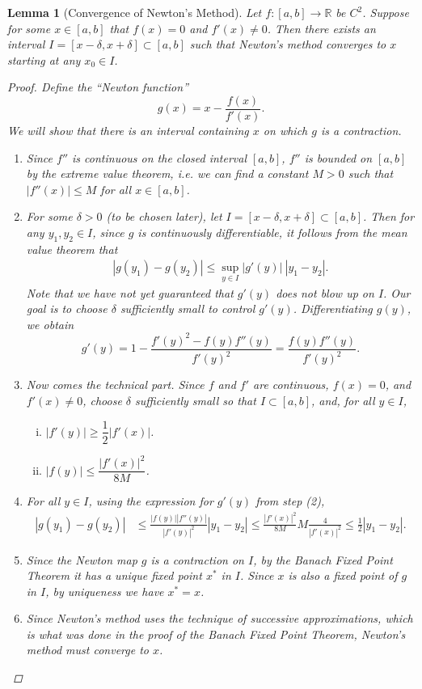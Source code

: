 \documentclass[12pt]{amsart}         %
\newtheorem{lemma}{Lemma}[section]
\theoremstyle{remark}
\newcommand{\R}{\mathbb{R}}
\begin{document}
\begin{lemma}[Convergence of Newton's Method]
Let $f: [a, b] \rightarrow \R$ be $C^2$. Suppose for some $x \in [a, b]$ that $f(x) = 0$ and $f'(x) \neq 0$. Then there exists an interval $I = [x - \delta, x + \delta] \subset [a, b]$ such that Newton's method converges to $x$ starting at any $x_0 \in I$.
\begin{proof}
Define the ``Newton function''
\[
g(x) = x - \frac{f(x)}{f'(x)}.
\]
We will show that there is an interval containing $x$ on which $g$ is a contraction. 
\begin{enumerate}
\item Since $f''$ is continuous on the closed interval $[a,b]$, $f''$ is bounded on $[a,b]$ by the extreme value theorem, i.e. we can find a constant $M>0$ such that $|f''(x)| \leq M$ for all $x \in [a,b]$.
\item For some $\delta > 0$ (to be chosen later), let $I = [x - \delta, x + \delta ] \subset [a, b]$. Then for any $y_1, y_2 \in I$, since $g$ is continuously differentiable, it follows from the mean value theorem that
\begin{align*}
|g(y_1) - g(y_2)| \leq \sup_{y \in I} |g'(y)| \: |y_1 - y_2|.
\end{align*}
Note that we have not yet guaranteed that $g'(y)$ does not blow up on $I$. Our goal is to choose $\delta$ sufficiently small to control $g'(y)$. Differentiating $g(y)$, we obtain
\[
g'(y) = 1 - \frac{f'(y)^2 - f(y)f''(y)}{f'(y)^2} = \frac{f(y)f''(y)}{f'(y)^2}.
\]
\item Now comes the technical part. Since $f$ and $f'$ are continuous, $f(x) = 0$, and $f'(x) \neq 0$, choose $\delta$ sufficiently small so that $I \subset [a,b]$, and, for all $y \in I$,
\begin{enumerate}[(i)]
    \item $|f'(y)| \geq \dfrac{1}{2}|f'(x)|$.
	\item $|f(y)|  \leq \dfrac{|f'(x)|^2}{8M}$.
\end{enumerate}
\item For all $y \in I$, using the expression for $g'(y)$ from step (2),
\begin{align*}
|g(y_1) - g(y_2)| &\leq \frac{|f(y)||f''(y)|}{|f'(y)|^2} |y_1 - y_2| 
\leq \frac{|f'(x)|^2}{8M}M\frac{4}{|f'(x)|^2} \leq \frac{1}{2}|y_1 - y_2|.
\end{align*}
\item Since the Newton map $g$ is a contraction on $I$, by the Banach Fixed Point Theorem it has a unique fixed point $x^*$ in $I$. Since $x$ is also a fixed point of $g$ in $I$, by uniqueness we have $x^* = x$.
\item Since Newton's method uses the technique of successive approximations, which is what was done in the proof of the Banach Fixed Point Theorem, Newton's method must converge to $x$.
\end{enumerate}
\end{proof}
\end{lemma}
\end{document}
